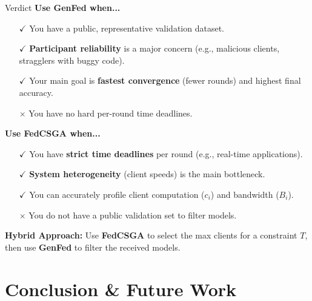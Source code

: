 \documentclass{beamer}
\begin{document}
\begin{frame}{Verdict}
\textbf{Use \textcolor{genfedblue}{GenFed} when...}
\begin{itemize}
    \item[$\checkmark$] You have a public, representative validation dataset.
    \item[$\checkmark$] \textbf{Participant reliability} is a major concern (e.g., malicious clients, stragglers with buggy code).
    \item[$\checkmark$] Your main goal is \textbf{fastest convergence} (fewer rounds) and highest final accuracy.
    \item[$\times$] You have no hard per-round time deadlines.
\end{itemize}

\textbf{Use \textcolor{fedcsgaorange}{FedCSGA} when...}
\begin{itemize}
    \item[$\checkmark$] You have \textbf{strict time deadlines} per round (e.g., real-time applications).
    \item[$\checkmark$] \textbf{System heterogeneity} (client speeds) is the main bottleneck.
    \item[$\checkmark$] You can accurately profile client computation ($c_i$) and bandwidth ($B_i$).
    \item[$\times$] You do not have a public validation set to filter models.
\end{itemize}

\textbf{Hybrid Approach:} Use \textbf{FedCSGA} to select the max clients for a constraint $T$, then use \textbf{GenFed} to filter the received models.
\end{frame}

\section{Conclusion \& Future Work}
\end{document}
